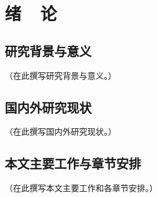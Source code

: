 \chapter{绪\ \ 论}

\section{研究背景与意义}
（在此撰写研究背景与意义。）

\section{国内外研究现状}
（在此撰写国内外研究现状。）

\section{本文主要工作与章节安排}
（在此撰写本文主要工作和各章节安排。）
